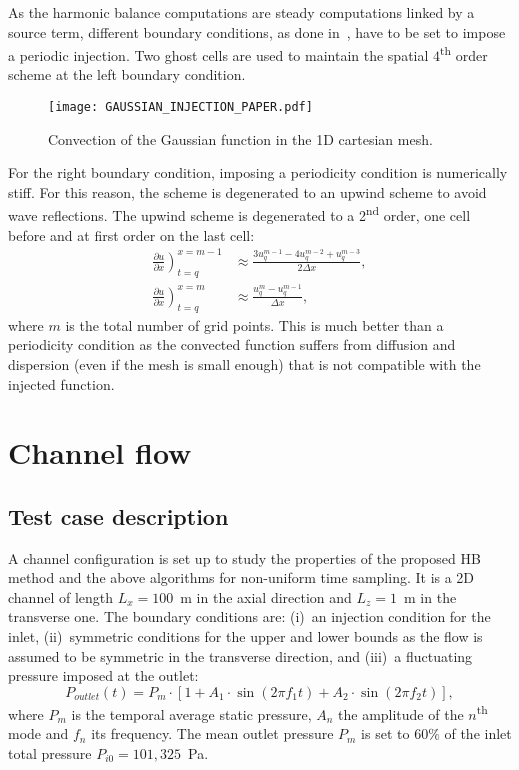 As the harmonic balance computations are steady computations linked 
by a source term, 
different boundary conditions, as done in~\cite{Dufour2010},
have to be set to impose a periodic injection. Two ghost cells
are used to maintain the spatial $4$\textsuperscript{th} order scheme 
at the left
boundary condition.
\begin{figure}[htbp]
  \begin{center}
    \texttt{[image: GAUSSIAN\_INJECTION\_PAPER.pdf]}
  \end{center}
  \caption{Convection of the Gaussian function in the 1D cartesian mesh.}
  \label{fig:convection_injection_paper}
\end{figure}
For the right boundary condition, imposing a periodicity condition is
numerically stiff. For this reason, the scheme is degenerated 
to an upwind scheme to avoid wave reflections. The upwind scheme is degenerated to
a 2\textsuperscript{nd} order, one cell before and at first order on the 
last cell:
\begin{align}
    \left. \frac{\partial u}{\partial x} \right)_{t=q}^{x=m-1} &\approx 
    \frac{3 u^{m-1}_{q} - 4 u^{m-2}_{q} + u^{m-3}_{q}}{2\Delta x}, \\
    \left. \frac{\partial u}{\partial x} \right)_{t=q}^{x=m} &\approx 
    \frac{u^{m}_{q} - u^{m-1}_{q}}{\Delta x},
\label{eq:upwind_scheme}
\end{align}
where $m$ is the total number of grid points. This is much better than a periodicity
condition as the convected function suffers from diffusion and dispersion (even if the
mesh is small enough) that is not compatible with the injected function.

\section{Channel flow}
\label{sec:channel-flow}

\subsection{Test case description}
A channel configuration is set up to study the properties of the
proposed HB method and the above algorithms for non-uniform time
sampling.  It is a 2D channel of length $L_x = 100$~m in the axial
direction and $L_z = 1$~m in the transverse one.  The boundary
conditions are: (i)~an injection condition for the inlet,
(ii)~symmetric conditions for the upper and lower bounds as the flow
is assumed to be symmetric in the transverse direction, and (iii)~a
fluctuating pressure imposed at the outlet:
\begin{equation}
  P_{outlet}(t) = P_m \cdot \left[1 + A_1 \cdot \sin(2 \pi f_1 t) +
    A_2 \cdot \sin(2 \pi f_2 t) \right],
  \label{eq:outlet_canal}
\end{equation}
where $P_m$ is the temporal average static pressure, $A_n$ the
amplitude of the $n$\textsuperscript{th} mode and $f_n$ its
frequency. The mean outlet pressure $P_m$ is set to $60\%$ of the
inlet total pressure $P_{i0} = 101,325$~Pa.

